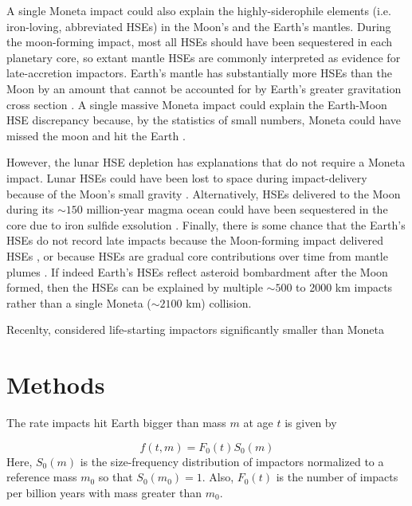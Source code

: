 \documentclass[preprint]{aastex63}
\begin{document}
A single Moneta impact could also explain the highly-siderophile elements (i.e. iron-loving, abbreviated HSEs) in the Moon's and the Earth's mantles. During the moon-forming impact, most all HSEs should have been sequestered in each planetary core, so extant mantle HSEs are commonly interpreted as evidence for late-accretion impactors. Earth's mantle has substantially more HSEs than the Moon by an amount that cannot be accounted for by Earth's greater gravitation cross section \citep{Day_2015}. A single massive Moneta impact could explain the Earth-Moon HSE discrepancy because, by the statistics of small numbers, Moneta could have missed the moon and hit the Earth \citep{Bottke_2010}.

However, the lunar HSE depletion has explanations that do not require a Moneta impact. Lunar HSEs could have been lost to space during impact-delivery because of the Moon's small gravity \citep{Kraus_2015}. Alternatively, HSEs delivered to the Moon during its $\sim 150$ million-year magma ocean could have been sequestered in the core due to iron sulfide exsolution \citep{Morbidelli_2018,Rubie_2016}. Finally, there is some chance that the Earth's HSEs do not record late impacts because the Moon-forming impact delivered HSEs \citep{Sleep_2016}, or because HSEs are gradual core contributions over time from mantle plumes \citep{Halliday_2023,Mundl_2020}. If indeed Earth's HSEs reflect asteroid bombardment after the Moon formed, then the HSEs can be explained by multiple $\sim 500$ to 2000 km impacts rather than a single Moneta ($\sim 2100$ km) collision.

Recenlty, \citep{Wogan_2023} considered life-starting impactors significantly smaller than Moneta


\section{Methods}
The rate impacts hit Earth bigger than mass $m$ at age $t$ is given by

\begin{equation}
  f(t,m) = F_0(t) S_0(m)
\end{equation}
Here, $S_0(m)$ is the size-frequency distribution of impactors normalized to a reference mass $m_0$ so that $S_0(m_0) = 1$. Also, $F_0(t)$ is the number of impacts per billion years with mass greater than $m_0$.
\end{document}
